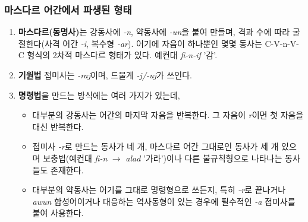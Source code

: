 \subsubsection{마스다르 어간에서 파생된 형태}
\begin{enumerate}
	\item \textbf{마스다르(동명사)}는 강동사에 \textit{-n}, 약동사에 \textit{-un}을 붙여 만들며, 격과 수에 따라 굴절한다(사격 어간 \textit{-i}, 복수형 \textit{-ar}). 어기에 자음이 하나뿐인 몇몇 동사는 C-V-n-V-C 형식의 2차적 마스다르 형태가 있다. 예컨대 \textit{fi-n-if} '감'.
	\item \textbf{기원법} 접미사는 \textit{-raj}이며, 드물게 \textit{-j/-uj}가 쓰인다.
	\item \textbf{명령법}을 만드는 방식에는 여러 가지가 있는데,
	\begin{itemize}
		\item 대부분의 강동사는 어간의 마지막 자음을 반복한다. 그 자음이 \textit{r}이면 첫 자음을 대신 반복한다.
		\item 접미사 \textit{-r}로 만드는 동사가 네 개, 마스다르 어간 그대로인 동사가 세 개 있으며 보충법(예컨대 \textit{fi-n} $\rightarrow$ \textit{alad} '가라')이나 다른 불규칙형으로 나타나는 동사들도 존재한다.
		\item 대부분의 약동사는 어기를 그대로 명령형으로 쓰든지, 특히 \textit{-r}로 끝나거나 \textit{awun} 합성어이거나 대응하는 역사동형이 있는 경우에 필수적인 \textit{-a} 접미사를 붙여 사용한다.
	\end{itemize}
\end{enumerate}
